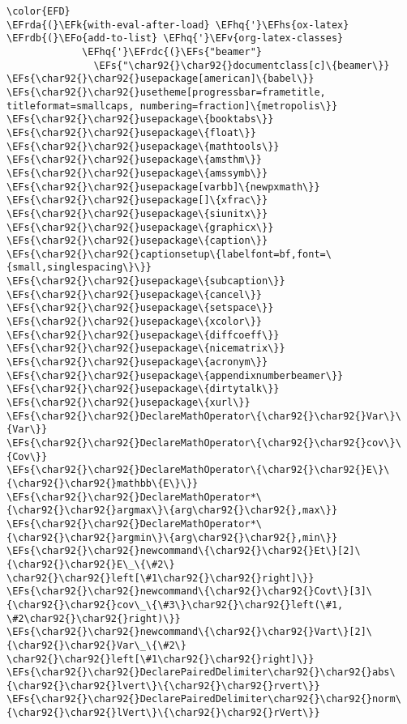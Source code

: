\documentclass[c]{article}
\theoremstyle{plain}%
\theoremstyle{definition}
\theoremstyle{remark}
\newcommand{\EFs}[1]{\textcolor{EFs}{#1}} %
\newcommand{\EFk}[1]{\textcolor{EFk}{#1}} %
\newcommand{\EFv}[1]{\textcolor{EFv}{#1}} %
\newcommand{\EFo}[1]{\textcolor{EFo}{#1}} %
\newcommand{\EFhq}[1]{\textcolor{EFhq}{#1}} %
\newcommand{\EFhs}[1]{\textcolor{EFhs}{#1}} %
\newcommand{\EFrda}[1]{\textcolor{EFrda}{#1}} %
\newcommand{\EFrdb}[1]{\textcolor{EFrdb}{#1}} %
\newcommand{\EFrdc}[1]{\textcolor{EFrdc}{#1}} %
\begin{document}
\begin{Code}
\begin{Verbatim}
\color{EFD}
\EFrda{(}\EFk{with-eval-after-load} \EFhq{'}\EFhs{ox-latex}
\EFrdb{(}\EFo{add-to-list} \EFhq{'}\EFv{org-latex-classes}
             \EFhq{'}\EFrdc{(}\EFs{"beamer"}
               \EFs{"\char92{}\char92{}documentclass[c]\{beamer\}}
\EFs{\char92{}\char92{}usepackage[american]\{babel\}}
\EFs{\char92{}\char92{}usetheme[progressbar=frametitle, titleformat=smallcaps, numbering=fraction]\{metropolis\}}
\EFs{\char92{}\char92{}usepackage\{booktabs\}}
\EFs{\char92{}\char92{}usepackage\{float\}}
\EFs{\char92{}\char92{}usepackage\{mathtools\}}
\EFs{\char92{}\char92{}usepackage\{amsthm\}}
\EFs{\char92{}\char92{}usepackage\{amssymb\}}
\EFs{\char92{}\char92{}usepackage[varbb]\{newpxmath\}}
\EFs{\char92{}\char92{}usepackage[]\{xfrac\}}
\EFs{\char92{}\char92{}usepackage\{siunitx\}}
\EFs{\char92{}\char92{}usepackage\{graphicx\}}
\EFs{\char92{}\char92{}usepackage\{caption\}}
\EFs{\char92{}\char92{}captionsetup\{labelfont=bf,font=\{small,singlespacing\}\}}
\EFs{\char92{}\char92{}usepackage\{subcaption\}}
\EFs{\char92{}\char92{}usepackage\{cancel\}}
\EFs{\char92{}\char92{}usepackage\{setspace\}}
\EFs{\char92{}\char92{}usepackage\{xcolor\}}
\EFs{\char92{}\char92{}usepackage\{diffcoeff\}}
\EFs{\char92{}\char92{}usepackage\{nicematrix\}}
\EFs{\char92{}\char92{}usepackage\{acronym\}}
\EFs{\char92{}\char92{}usepackage\{appendixnumberbeamer\}}
\EFs{\char92{}\char92{}usepackage\{dirtytalk\}}
\EFs{\char92{}\char92{}usepackage\{xurl\}}
\EFs{\char92{}\char92{}DeclareMathOperator\{\char92{}\char92{}Var\}\{Var\}}
\EFs{\char92{}\char92{}DeclareMathOperator\{\char92{}\char92{}cov\}\{Cov\}}
\EFs{\char92{}\char92{}DeclareMathOperator\{\char92{}\char92{}E\}\{\char92{}\char92{}mathbb\{E\}\}}
\EFs{\char92{}\char92{}DeclareMathOperator*\{\char92{}\char92{}argmax\}\{arg\char92{}\char92{},max\}}
\EFs{\char92{}\char92{}DeclareMathOperator*\{\char92{}\char92{}argmin\}\{arg\char92{}\char92{},min\}}
\EFs{\char92{}\char92{}newcommand\{\char92{}\char92{}Et\}[2]\{\char92{}\char92{}E\_\{\#2\} \char92{}\char92{}left[\#1\char92{}\char92{}right]\}}
\EFs{\char92{}\char92{}newcommand\{\char92{}\char92{}Covt\}[3]\{\char92{}\char92{}cov\_\{\#3\}\char92{}\char92{}left(\#1, \#2\char92{}\char92{}right)\}}
\EFs{\char92{}\char92{}newcommand\{\char92{}\char92{}Vart\}[2]\{\char92{}\char92{}Var\_\{\#2\} \char92{}\char92{}left[\#1\char92{}\char92{}right]\}}
\EFs{\char92{}\char92{}DeclarePairedDelimiter\char92{}\char92{}abs\{\char92{}\char92{}lvert\}\{\char92{}\char92{}rvert\}}
\EFs{\char92{}\char92{}DeclarePairedDelimiter\char92{}\char92{}norm\{\char92{}\char92{}lVert\}\{\char92{}\char92{}rVert\}}

\end{Verbatim}
\end{Code}
\end{document}
